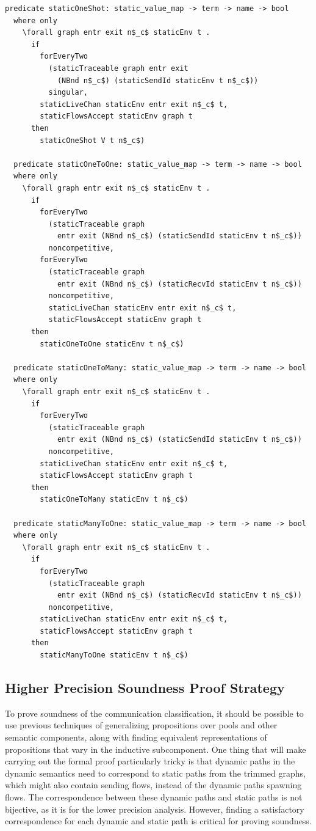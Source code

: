 \documentclass[letterpaper, 11pt]{extarticle}
\begin{document}
\begin{lstlisting}[language=logic, mathescape]
  predicate staticOneShot: static_value_map -> term -> name -> bool
  where only
    \forall graph entr exit n$_c$ staticEnv t . 
      if
        forEveryTwo
          (staticTraceable graph entr exit
            (NBnd n$_c$) (staticSendId staticEnv t n$_c$))
          singular, 
        staticLiveChan staticEnv entr exit n$_c$ t, 
        staticFlowsAccept staticEnv graph t
      then
        staticOneShot V t n$_c$)

  predicate staticOneToOne: static_value_map -> term -> name -> bool
  where only
    \forall graph entr exit n$_c$ staticEnv t .
      if
        forEveryTwo
          (staticTraceable graph
            entr exit (NBnd n$_c$) (staticSendId staticEnv t n$_c$))
          noncompetitive, 
        forEveryTwo
          (staticTraceable graph
            entr exit (NBnd n$_c$) (staticRecvId staticEnv t n$_c$))
          noncompetitive,
          staticLiveChan staticEnv entr exit n$_c$ t,
          staticFlowsAccept staticEnv graph t
      then
        staticOneToOne staticEnv t n$_c$)

  predicate staticOneToMany: static_value_map -> term -> name -> bool
  where only
    \forall graph entr exit n$_c$ staticEnv t .
      if
        forEveryTwo
          (staticTraceable graph
            entr exit (NBnd n$_c$) (staticSendId staticEnv t n$_c$))
          noncompetitive,
        staticLiveChan staticEnv entr exit n$_c$ t,
        staticFlowsAccept staticEnv graph t
      then
        staticOneToMany staticEnv t n$_c$)

  predicate staticManyToOne: static_value_map -> term -> name -> bool
  where only
    \forall graph entr exit n$_c$ staticEnv t .
      if
        forEveryTwo
          (staticTraceable graph
            entr exit (NBnd n$_c$) (staticRecvId staticEnv t n$_c$))
          noncompetitive, 
        staticLiveChan staticEnv entr exit n$_c$ t,
        staticFlowsAccept staticEnv graph t
      then
        staticManyToOne staticEnv t n$_c$)
  \end{lstlisting}


\subsection{Higher Precision Soundness Proof Strategy}
To prove soundness of the communication classification, it should be possible to use
previous techniques of generalizing propositions over pools and other semantic components,
along with finding equivalent representations of propositions that vary in the inductive
subcomponent. One thing that will make carrying out the formal proof particularly tricky is
that dynamic paths in the dynamic semantics need to correspond to static paths from
the trimmed graphs, which might also contain sending flows,
instead of the dynamic paths spawning flows.
The correspondence between these dynamic paths and static paths
is not bijective, as it is for the lower precision analysis. However, finding a satisfactory
correspondence for each dynamic and static path is critical for proving soundness.
\end{document}
